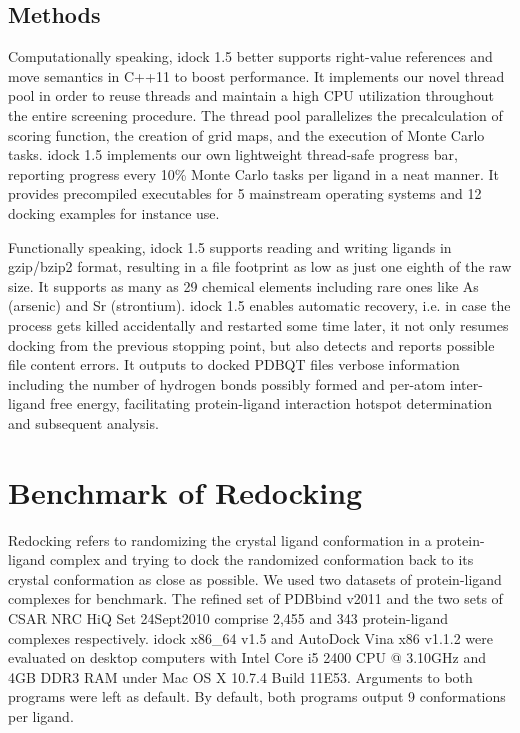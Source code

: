 \documentclass{bioinfo}
\begin{document}
\begin{methods}
\section{Methods}

Computationally speaking, idock 1.5 better supports right-value references and move semantics in C++11 to boost performance. It implements our novel thread pool in order to reuse threads and maintain a high CPU utilization throughout the entire screening procedure. The thread pool parallelizes the precalculation of scoring function, the creation of grid maps, and the execution of Monte Carlo tasks. idock 1.5 implements our own lightweight thread-safe progress bar, reporting progress every 10\% Monte Carlo tasks per ligand in a neat manner. It provides precompiled executables for 5 mainstream operating systems and 12 docking examples for instance use.

Functionally speaking, idock 1.5 supports reading and writing ligands in gzip/bzip2 format, resulting in a file footprint as low as just one eighth of the raw size. It supports as many as 29 chemical elements including rare ones like As (arsenic) and Sr (strontium). idock 1.5 enables automatic recovery, i.e. in case the process gets killed accidentally and restarted some time later, it not only resumes docking from the previous stopping point, but also detects and reports possible file content errors. It outputs to docked PDBQT files verbose information including the number of hydrogen bonds possibly formed and per-atom inter-ligand free energy, facilitating protein-ligand interaction hotspot determination and subsequent analysis.

\end{methods}

\section{Benchmark of Redocking}

Redocking refers to randomizing the crystal ligand conformation in a protein-ligand complex and trying to dock the randomized conformation back to its crystal conformation as close as possible. We used two datasets of protein-ligand complexes for benchmark. The refined set of PDBbind v2011 \citep{530} and the two sets of CSAR NRC HiQ Set 24Sept2010 \citep{857} comprise 2,455 and 343 protein-ligand complexes respectively. idock x86\_64 v1.5 and AutoDock Vina x86 v1.1.2 were evaluated on desktop computers with Intel Core i5 2400 CPU @ 3.10GHz and 4GB DDR3 RAM under Mac OS X 10.7.4 Build 11E53. Arguments to both programs were left as default. By default, both programs output 9 conformations per ligand.
\end{document}

